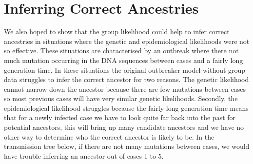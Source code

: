 \documentclass[11pt,a4paper]{report}
\begin{document}
\section{Inferring Correct Ancestries}
We also hoped to show that the group likelihood could help to infer correct ancestries in situations where the genetic and epidemiological likelihoods were not so effective. These situations are characterised by an outbreak where there not much mutation occurring in the DNA sequences between cases and a fairly long generation time. In these situations the original outbreaker model without group data struggles to infer the correct ancestor for two reasons. The genetic likelihood cannot narrow down the ancestor because there are few mutations between cases so most previous cases will have very similar genetic likelihoods. Secondly, the epidemiological likelihood struggles because the fairly long generation time means that for a newly infected case we have to look quite far back into the past for potential ancestors, this will bring up many candidate ancestors and we have no other way to determine who the correct ancestor is likely to be. In the transmission tree below, if there are not many mutations between cases, we would have trouble inferring an ancestor out of cases 1 to 5.
\\
\begin{center}
\end{center}	
\end{document}
